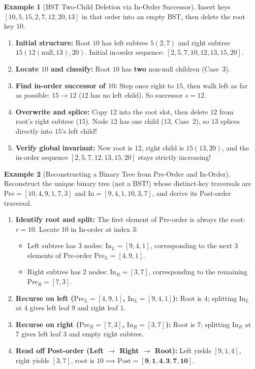 \documentclass[11pt,a4paper]{article}
\theoremstyle{definition}
\newtheorem{example}{Example}[section]
\begin{document}
\begin{example}[BST Two-Child Deletion via In-Order Successor]
Insert keys $[10, 5, 15, 2, 7, 12, 20, 13]$ in that order into an empty BST, then delete the root key $10$.
\begin{enumerate}
    \item \textbf{Initial structure:} Root $10$ has left subtree $5(2, 7)$ and right subtree $15(12(\text{null}, 13), 20)$. Initial in-order sequence: $[2, 5, 7, 10, 12, 13, 15, 20]$.
    \item \textbf{Locate $10$ and classify:} Root $10$ has \textbf{two} non-null children (Case~3).
    \item \textbf{Find in-order successor of $10$:} Step once right to $15$, then walk left as far as possible: $15 \to 12$ ($12$ has no left child). So successor $s = 12$.
    \item \textbf{Overwrite and splice:} Copy $12$ into the root slot, then delete $12$ from root's right subtree ($15$). Node $12$ has one child ($13$, Case~2), so $13$ splices directly into $15$'s left child!
    \item \textbf{Verify global invariant:} New root is $12$, right child is $15(13, 20)$, and the in-order sequence $[2, 5, 7, 12, 13, 15, 20]$ stays strictly increasing!
\end{enumerate}
\end{example}

\begin{example}[Reconstructing a Binary Tree from Pre-Order and In-Order]
Reconstruct the unique binary tree (not a BST!) whose distinct-key traversals are $\text{Pre} = [10, 4, 9, 1, 7, 3]$ and $\text{In} = [9, 4, 1, 10, 3, 7]$, and derive its Post-order traversal.
\begin{enumerate}
    \item \textbf{Identify root and split:} The first element of Pre-order is always the root: $r = 10$. Locate $10$ in In-order at index $3$:
    \begin{itemize}[itemsep=1pt, topsep=2pt]
        \item Left subtree has $3$ nodes: $\text{In}_L = [9, 4, 1]$, corresponding to the next $3$ elements of Pre-order $\text{Pre}_L = [4, 9, 1]$.
        \item Right subtree has $2$ nodes: $\text{In}_R = [3, 7]$, corresponding to the remaining $\text{Pre}_R = [7, 3]$.
    \end{itemize}
    \item \textbf{Recurse on left ($\text{Pre}_L = [4, 9, 1]$, $\text{In}_L = [9, 4, 1]$):} Root is $4$; splitting $\text{In}_L$ at $4$ gives left leaf $9$ and right leaf $1$.
    \item \textbf{Recurse on right ($\text{Pre}_R = [7, 3]$, $\text{In}_R = [3, 7]$):} Root is $7$; splitting $\text{In}_R$ at $7$ gives left leaf $3$ and empty right subtree.
    \item \textbf{Read off Post-order (Left $\to$ Right $\to$ Root):} Left yields $[9, 1, 4]$, right yields $[3, 7]$, root is $10 \implies \text{Post} = [\mathbf{9, 1, 4, 3, 7, 10}]$.
\end{enumerate}
\end{example}
\end{document}
